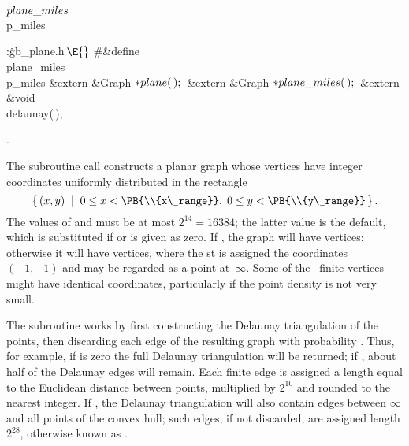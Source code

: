 \Y\B\4\D$\\{plane\_miles}$ \5
\\{p\_miles}\par
\Y\B\4:\.{gb\_plane.h\,}\X${}\E{}$\6
\8\#\&{define} \\{plane\_miles}\5\\{p\_miles}\6
\&{extern} \&{Graph} ${}{*}\\{plane}(\,);{}$\6
\&{extern} \&{Graph} ${}{*}\\{plane\_miles}(\,);{}$\6
\&{extern} \&{void} \\{delaunay}(\,);\par
{}.\fi

The subroutine call  constructs
a planar graph whose vertices have integer coordinates
uniformly distributed in the rectangle
$$\{\,(x,y)\;\mid\;0\le x<\PB{\\{x\_range}}, \;0\le y<\PB{\\{y\_range}}\,\}%
\,.$$
The values of  and  must be at most
$2^{14}=16384$; the
latter value is the default, which is substituted if  or 
is given as zero. If , the graph will have 
vertices; otherwise
it will have  vertices, where the st is
assigned the coordinates
$(-1,-1)$ and may be regarded as a point at~$\infty$.
Some of the ~finite vertices might have identical coordinates,
particularly
if the point density  is not very small.

The subroutine works by first constructing the Delaunay triangulation
of the points, then discarding
each edge of the resulting graph with probability .
Thus,
for example, if  is zero the full Delaunay triangulation will be
returned; if , about half of the Delaunay edges will
remain.
Each finite edge is assigned a length equal to the Euclidean distance between
points, multiplied by $2^{10}$ and
rounded to the nearest integer. If , the
Delaunay triangulation will also contain edges between $\infty$ and
all points of the convex hull; such edges, if not discarded, are
assigned length $2^{28}$, otherwise known as .

